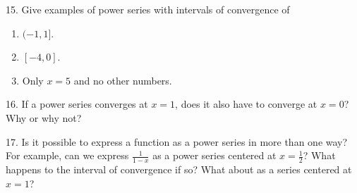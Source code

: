 \documentclass{article}
\begin{document}
15. Give examples of power series with intervals of convergence of

\begin{enumerate}

	\item $(-1, 1]$.

	\item $[-4, 0]$.

	\item Only $x = 5$ and no other numbers.

\end{enumerate}

16. If a power series converges at $x = 1$, does it also have to converge at $x = 0$? Why or why not?

17. Is it possible to express a function as a power series in more than one way? For example, can we express $\displaystyle \frac{1}{1 - x}$ as a power series centered at $x = \frac{1}{2}$? What happens to the interval of convergence if so? What about as a series centered at $x = 1$?
\end{document}
